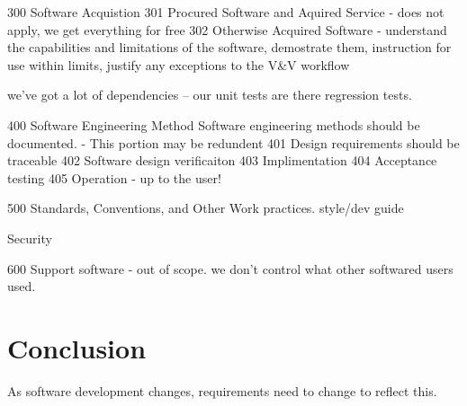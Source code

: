 \documentclass{anstrans}
\begin{document}
300 Software Acquistion
301 Procured Software and Aquired Service - does not apply, we get everything for free
302 Otherwise Acquired Software - understand the capabilities and limitations of the software, demostrate them, instruction for use within limits, justify any exceptions to the V\&V workflow

we've got a lot of dependencies -- our unit tests are there regression tests.

400 Software Engineering Method
Software engineering methods should be documented.
- This portion may be redundent
401 Design requirements should be traceable
402 Software design verificaiton
403 Implimentation
404 Acceptance testing
405 Operation - up to the user!

500 Standards, Conventions, and Other Work practices. style/dev guide

Security

600 Support software - out of scope. we don't control what other softwared users used. 



\section{Conclusion}

As software development changes, requirements need to change to reflect this.



\end{document}
